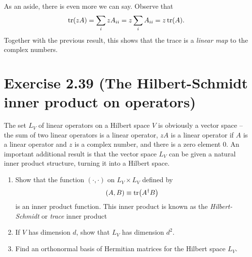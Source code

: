 \documentclass{book}
\begin{document}
    As an aside, there is even more we can say. Observe that
    \begin{align}
        \tr(z A) = \sum_i z A_{ii} = z \sum_i A_{ii} = z\tr(A).
    \end{align}
    Together with the previous result, this shows that the trace is a \emph{linear map} to the complex numbers.
    
\section*{Exercise 2.39 (The Hilbert-Schmidt inner product on operators)}
    The set $L_V$ of linear operators on a Hilbert space $V$ is obviously a vector space – the sum of two linear operators is a linear operator, $zA$ is a linear operator if $A$ is a linear operator and $z$ is a complex number, and there is a zero element $0$. An important additional result is that the vector space $L_V$ can be given a natural inner product structure, turning it into a Hilbert space.
    
    \begin{enumerate}
        \item Show that the function $(\cdot, \cdot)$ on $L_V \times L_V$ defined by 
        \begin{align}
            (A,B) \equiv \tr(A^\dagger B)
        \end{align}
        is an inner product function. This inner product is known as the \emph{Hilbert-Schmidt} or \emph{trace} inner product
        
        \item If $V$ has dimension $d$, show that $L_V$ has dimension $d^2$.
        
        \item Find an orthonormal basis of Hermitian matrices for the Hilbert space $L_V$.
    \end{enumerate}
    
\end{document}
